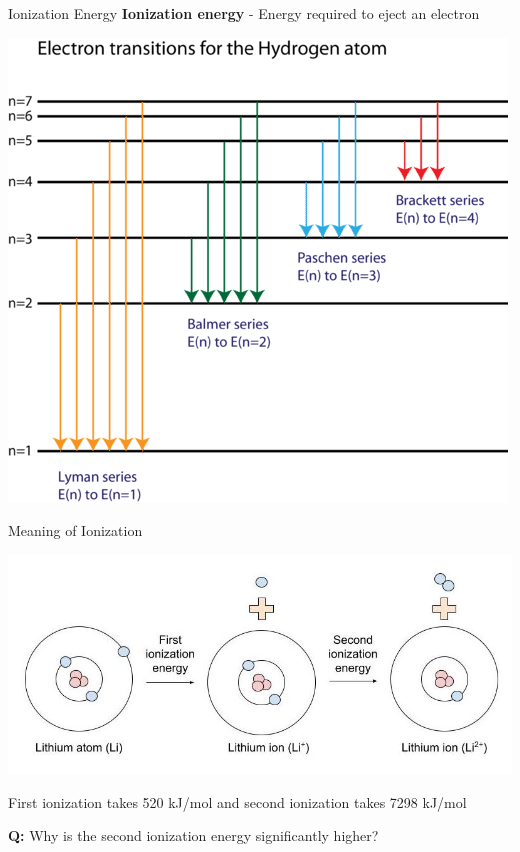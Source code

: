\documentclass[11pt]{beamer}
\begin{document}
\begin{frame}{Ionization Energy}
  \textbf{Ionization energy} - Energy required to eject an electron

  \centering
  \includegraphics[scale=0.35]{energy_trans_h}
\end{frame}

\begin{frame}{Meaning of Ionization}
  \begin{center}
    \includegraphics[width=\linewidth]{ionization_Li}
  \end{center}

  First ionization takes 520 kJ/mol and second ionization takes
  7298 kJ/mol

  \textbf{Q:} Why is the second ionization energy significantly higher?
\end{frame}
\end{document}
